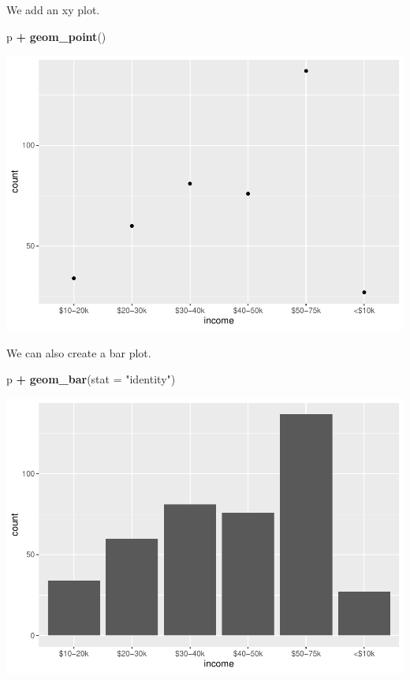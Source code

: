 \documentclass[]{book}
\newenvironment{Shaded}{\begin{snugshade}}{\end{snugshade}}
\newcommand{\DataTypeTok}[1]{\textcolor[rgb]{0.13,0.29,0.53}{#1}}
\newcommand{\KeywordTok}[1]{\textcolor[rgb]{0.13,0.29,0.53}{\textbf{#1}}}
\newcommand{\NormalTok}[1]{#1}
\newcommand{\OperatorTok}[1]{\textcolor[rgb]{0.81,0.36,0.00}{\textbf{#1}}}
\newcommand{\StringTok}[1]{\textcolor[rgb]{0.31,0.60,0.02}{#1}}
\begin{document}
We add an xy plot.

\begin{Shaded}
\begin{Highlighting}[]
\NormalTok{p }\OperatorTok{+}\StringTok{ }\KeywordTok{geom_point}\NormalTok{()}
\end{Highlighting}
\end{Shaded}

\includegraphics{bookdown-demo_files/figure-latex/unnamed-chunk-13-1.pdf}

We can also create a bar plot.

\begin{Shaded}
\begin{Highlighting}[]
\NormalTok{p }\OperatorTok{+}\StringTok{ }\KeywordTok{geom_bar}\NormalTok{(}\DataTypeTok{stat =} \StringTok{"identity"}\NormalTok{)}
\end{Highlighting}
\end{Shaded}

\includegraphics{bookdown-demo_files/figure-latex/unnamed-chunk-14-1.pdf}
\end{document}
